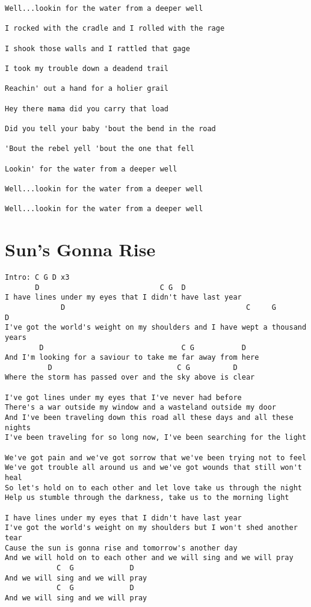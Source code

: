 \documentclass[leqno]{memoir}
\begin{document}
\begin{verbatim}
Well...lookin for the water from a deeper well 

I rocked with the cradle and I rolled with the rage 

I shook those walls and I rattled that gage 

I took my trouble down a deadend trail 

Reachin' out a hand for a holier grail 

Hey there mama did you carry that load 

Did you tell your baby 'bout the bend in the road

'Bout the rebel yell 'bout the one that fell 

Lookin' for the water from a deeper well 

Well...lookin for the water from a deeper well 

Well...lookin for the water from a deeper well

\end{verbatim}
\newpage\chapter{Sun's Gonna Rise}
\begin{verbatim}
Intro: C G D x3
       D                            C G  D
I have lines under my eyes that I didn't have last year
             D                                          C     G        D
I've got the world's weight on my shoulders and I have wept a thousand years
        D                                C G           D
And I'm looking for a saviour to take me far away from here
          D                             C G          D
Where the storm has passed over and the sky above is clear
       
I've got lines under my eyes that I've never had before
There's a war outside my window and a wasteland outside my door
And I've been traveling down this road all these days and all these nights
I've been traveling for so long now, I've been searching for the light

We've got pain and we've got sorrow that we've been trying not to feel
We've got trouble all around us and we've got wounds that still won't heal
So let's hold on to each other and let love take us through the night
Help us stumble through the darkness, take us to the morning light

I have lines under my eyes that I didn't have last year
I've got the world's weight on my shoulders but I won't shed another tear
Cause the sun is gonna rise and tomorrow's another day
And we will hold on to each other and we will sing and we will pray
            C  G             D
And we will sing and we will pray
            C  G             D
And we will sing and we will pray
\end{verbatim}
\newpage
\end{document}
